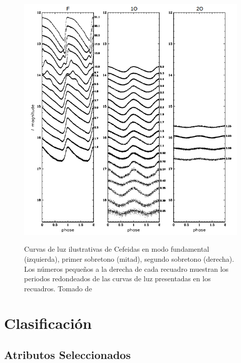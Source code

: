 \documentclass[letterpaper,12pt]{book}
\begin{document}
\begin{figure}
  \includegraphics[width = \textwidth]{./img/C2Datos/tiposCefeidas.png}
  \label{fig:tiposCefeidas}
  \caption{Curvas de luz ilustrativas de Cefeidas en modo fundamental (izquierda), primer sobretono (mitad), segundo sobretono (derecha). Los números pequeños a la derecha de cada recuadro muestran los periodos redondeados de las curvas de luz presentadas en los recuadros. Tomado de \cite{soszynski_optical_2011}}
\end{figure}

\chapter{Clasificación}\label{cap:clasificacion}



\section{Atributos Seleccionados \label{sec:atributos}}
\end{document}
